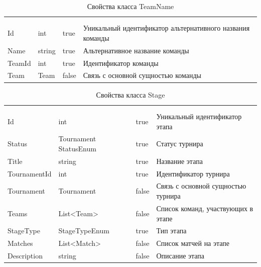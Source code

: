 \begin{xltabular}{\textwidth}{|X|X|X|X|}
	\caption{Свойства класса TeamName}\label{table:TeamName}\\ \hline
	 &  &  &  \\ \hline
	 &  &  &  \\ \hline
	\endfirsthead
	 \hline
	 &  &  &  \\ \hline
	\endhead
	Id & int & true & Уникальный идентификатор альтернативного названия команды \\ \hline
	Name & string & true & Альтернативное название команды \\ \hline
	TeamId & int & true & Идентификатор команды \\ \hline
	Team & Team & false & Связь с основной сущностью команды \\ \hline
\end{xltabular}

\begin{xltabular}{\textwidth}{|X|X|X|X|}
	\caption{Свойства класса Stage}\label{table:Stage}\\ \hline
	 &  &  &  \\ \hline
	 &  &  &  \\ \hline
	\endfirsthead
	 \hline
	 &  &  &  \\ \hline
	\endhead
	Id & int & true & Уникальный идентификатор этапа \\ \hline
	Status & Tournament
	StatusEnum & true & Статус турнира \\ \hline
	Title & string & true & Название этапа \\ \hline
	TournamentId & int & true & Идентификатор турнира \\ \hline
	Tournament & Tournament & false & Связь с основной сущностью турнира \\ \hline
	Teams & List<Team> & false & Список команд, участвующих в этапе \\ \hline
	StageType & StageTypeEnum & true & Тип этапа \\ \hline
	Matches & List<Match> & false & Список матчей на этапе \\ \hline
	Description & string & false & Описание этапа \\ \hline
\end{xltabular}

